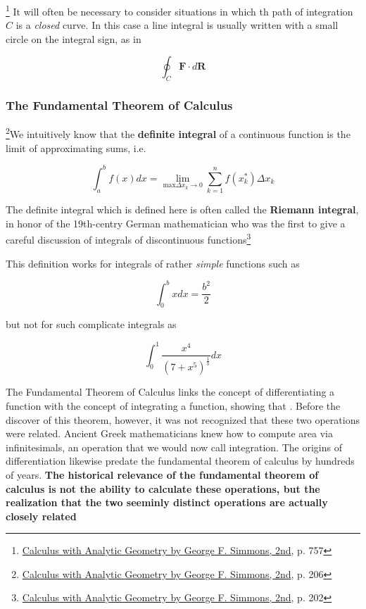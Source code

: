 \begin{tcolorbox}[enhanced,arc=3mm,boxrule=1.5mm,
    frame hidden,colback=blue!10!white,
    borderline={1mm}{0mm}{blue,dotted}
]
    \footnote{\href{https://trello.com/c/byu9Pyy8}{Calculus with Analytic Geometry by George F. Simmons, 2nd}, p. 757} It
    will often be necessary to consider situations in which th path of integration $C$ is a \textit{closed} curve. In this
    case a line integral is usually written with a small circle on the integral sign, as in

    \[
        \oint_{C} \boldsymbol{F} \cdot d\boldsymbol{R}
    \]
\end{tcolorbox}

\subsubsection{The Fundamental Theorem of Calculus}

\footnote{\href{https://trello.com/c/byu9Pyy8}{Calculus with Analytic Geometry by George F. Simmons, 2nd}, p. 206}We
intuitively know that the \textbf{definite integral} of a continuous function is the limit of approximating sums, i.e.

\begin{equation}\label{eq:riemann-integral}
    \int_{a}^{b} f(x)dx = \lim\limits_{\text{max}\Delta x_k \rightarrow 0}\sum_{k = 1}^{n} f(x_k^*)\Delta x_k
\end{equation}

The definite integral which is defined here is often called the \textbf{Riemann integral}, in honor of the 19th-centry
German mathematician who was the first to give a careful discussion of integrals of discontinuous
functions\footnote{\href{https://trello.com/c/byu9Pyy8}{Calculus with Analytic Geometry by George F. Simmons, 2nd}, p. 202}

This definition works for integrals of rather \textit{simple} functions such as

\[
    \int_0^b xdx = \frac{b^2}{2}
\]

but not for such complicate integrals as

\[
    \int_{0}^{1}\frac{x^4}{(7 + x^5)^{\frac{1}{3}}} dx
\]

The Fundamental Theorem of Calculus links the concept of differentiating a function with the concept of integrating a
function, showing that . Before
the discover of this theorem, however, it was not recognized that these two operations were related. Ancient Greek
mathematicians knew how to compute area via infinitesimals, an operation that we would now call integration. The origins
of differentiation likewise predate the fundamental theorem of calculus by hundreds of years. \textbf{The
historical relevance of the fundamental theorem of calculus is not the ability to calculate these operations, but the
realization that the two seeminly distinct operations are actually closely related}

